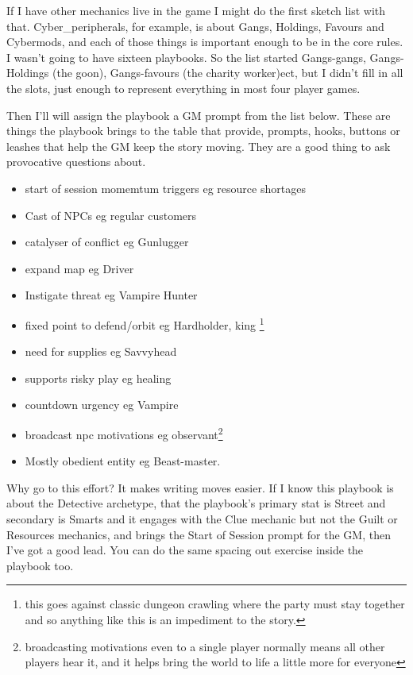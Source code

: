 \documentclass{tufte-handout}
\begin{document}
If I have other mechanics live in the game I might do the first sketch list with that. Cyber\_peripherals, for example, is about Gangs, Holdings, Favours and Cybermods, and each of those things is important enough to be in the core rules. I wasn't going to have sixteen playbooks. So the list started Gangs-gangs, Gangs-Holdings (the goon), Gangs-favours (the charity worker)ect, but I didn't fill in all the slots, just enough to represent everything in most four player games.

Then I'll will assign the playbook a GM prompt from the list below. These are things the playbook brings to the table that provide, prompts, hooks, buttons or leashes that help the GM keep the story moving.  They are a good thing to ask provocative questions about.

\begin{itemize}
\item start of session momemtum triggers eg resource shortages
\item Cast of NPCs  eg regular customers
\item catalyser of conflict eg Gunlugger
\item expand map eg Driver
\item Instigate threat eg Vampire Hunter
\item fixed point to defend/orbit eg Hardholder, king \footnote{this goes against classic dungeon crawling where the party must stay together and so anything like this is an impediment to the story.}
\item need for supplies eg Savvyhead
\item supports risky play eg healing
\item countdown urgency eg Vampire
\item broadcast npc motivations eg observant\footnote{broadcasting motivations even to a single player normally means all other players hear it, and it helps bring the world to life a little more for everyone}
\item Mostly obedient entity eg Beast-master.
\end{itemize}

Why go to this effort? It makes writing moves easier. If I know this playbook is about the Detective archetype, that the playbook's primary stat is Street and secondary is Smarts and it engages with the Clue mechanic but not the Guilt or Resources mechanics, and brings the Start of Session prompt for the GM, then I've got a good lead. You can do the same spacing out exercise inside the playbook too. 
\end{document}
